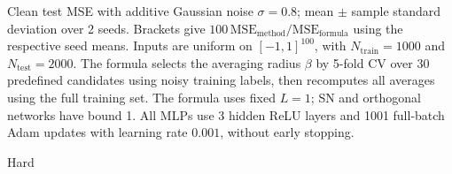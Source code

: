 \documentclass[10pt]{article}
\begin{document}
\clearpage
\begin{table}[t]
\centering
\footnotesize
\setlength{\tabcolsep}{3pt}
\caption{Clean test MSE with additive Gaussian noise $\sigma=0.8$; mean $\pm$ sample standard deviation over 2 seeds. Brackets give $100\,\mathrm{MSE}_{\mathrm{method}}/\mathrm{MSE}_{\mathrm{formula}}$ using the respective seed means. Inputs are uniform on $[-1,1]^{100}$, with $N_{\mathrm{train}}=1000$ and $N_{\mathrm{test}}=2000$. The formula selects the averaging radius $\beta$ by 5-fold CV over 30 predefined candidates using noisy training labels, then recomputes all averages using the full training set. The formula uses fixed $L=1$; SN and orthogonal networks have bound 1. All MLPs use 3 hidden ReLU layers and 1001 full-batch Adam updates with learning rate $0.001$, without early stopping.}
\label{tab:noisy-0p8-ratio1}
\begin{subtable}{\textwidth}
\centering
\caption{Hard}
\label{tab:noisy-0p8-ratio1-1}
\end{subtable}
\par\medskip
\begin{subtable}{\textwidth}
\centering
\caption{Tied}
\label{tab:noisy-0p8-ratio1-2}
\end{subtable}
\end{table}
\end{document}
